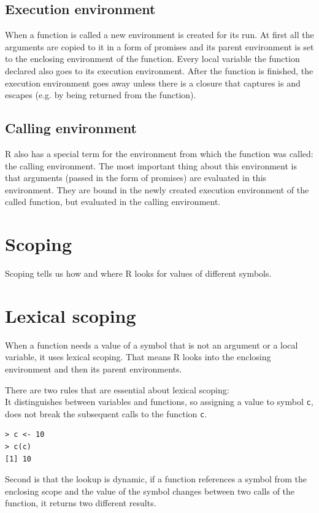 \documentclass[thesis=B,english]{FITthesis}[2012/10/20]
\begin{document}
\subsection{Execution environment}
When a function is called a new environment is created for its run. At first all the arguments are copied to it in a form of promises and its parent environment is set to the enclosing environment of the function. Every local variable the function declared also goes to its execution environment. After the function is finished, the execution environment goes away unless there is a closure that captures is and escapes (e.g. by being returned from the function). 

\subsection{Calling environment}
R also has a special term for the environment from which the function was called: the calling environment. The most important thing about this environment is that arguments (passed in the form of promises) are evaluated in this environment. They are bound in the newly created execution environment of the called function, but evaluated in the calling environment.

\section{Scoping}
Scoping tells us how and where R looks for values of different symbols.

\section{Lexical scoping}
When a function needs a value of a symbol that is not an argument or a local variable, it uses lexical scoping. That means R looks into the enclosing environment and then its parent environments.

There are two rules that are essential about lexical scoping: \\
It distinguishes between variables and functions, so assigning a value to symbol \verb|c|, does not break the subsequent calls to the function \verb|c|.

\begin{verbatim}
> c <- 10
> c(c)
[1] 10
\end{verbatim}

Second is that the lookup is dynamic, if a function references a symbol from the enclosing scope and the value of the symbol changes between two calls of the function, it returns two different results.
\end{document}
